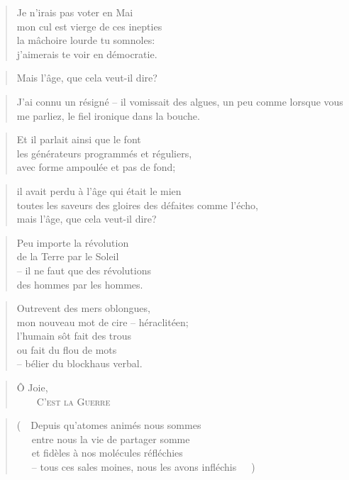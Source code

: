   \begin{verse}
    Je n’irais pas voter en Mai\\
    mon cul est vierge de ces inepties\\
    la mâchoire lourde tu somnoles:\\
    j’aimerais te voir en démocratie.
  \end{verse}
  \begin{verse}
    Mais l’âge, que cela veut-il dire?
  \end{verse}
  \begin{verse}
    J’ai connu un résigné -- il  vomissait des algues, un peu comme lorsque
    vous me parliez, le fiel ironique dans la bouche.
  \end{verse}
  \begin{verse}
    Et il parlait ainsi que le font\\
    les générateurs programmés et réguliers,\\
    avec forme ampoulée et pas de fond;
  \end{verse}
  \begin{verse}
    il avait perdu à l’âge qui était le mien\\
    toutes les saveurs des gloires des défaites comme l’écho,\\
    mais l’âge, que cela veut-il dire?
  \end{verse}
  \begin{verse}
    Peu importe la révolution\\
    de la Terre par le Soleil\\
    -- il ne faut que des révolutions\\
    des hommes par les hommes.
  \end{verse}
  \begin{verse}
    Outrevent des mers oblongues,\\
    mon nouveau mot de cire -- héraclitéen;\\
    l’humain sôt fait des trous\\
    ou fait du flou de mots\\
    -- bélier du blockhaus verbal.
  \end{verse}
  \begin{verse}
    Ô Joie,\\
    ~~~~\textsc{C’est la Guerre}
  \end{verse}
  \begin{verse}
    (~~Depuis qu’atomes animés nous sommes\\
    ~~~entre nous la vie de partager somme\\
    ~~~et fidèles à nos molécules réfléchies\\
    ~~~-- tous ces sales moines, nous les avons infléchis~~~)
  \end{verse}

